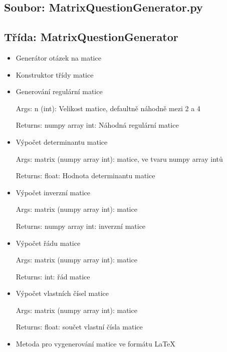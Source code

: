 \documentclass{article}
\begin{document}
\subsection*{Soubor: MatrixQuestionGenerator.py}
\begin{itemize}
 \subsection*{Třída: MatrixQuestionGenerator}
\begin{itemize}
\item{Generátor otázek na matice
    }
\item{Konstruktor třídy matice
        }
\item{Generování regulární matice

Args:
    n (int): Velikost matice, defaultně náhodně mezi 2 a 4

Returns:
    numpy array int: Náhodná regulární matice}
\item{Výpočet determinantu matice

Args:
    matrix (numpy array int):  matice, ve tvaru numpy array intů
    
Returns:
    float: Hodnota determinantu matice}
\item{Výpočet inverzní matice

Args:
    matrix (numpy array int): matice

Returns:
    numpy array int: inverzní matice}
\item{Výpočet řádu matice

Args:
    matrix (numpy array int): matice

Returns:
    int: řád matice}
\item{Výpočet vlastních čísel matice

Args:
    matrix (numpy array int): matice

Returns:
    float: součet vlastní čísla matice}
\item{Metoda pro vygenerování matice ve formátu LaTeX

}
\end{itemize}
\end{itemize}
\end{document}
